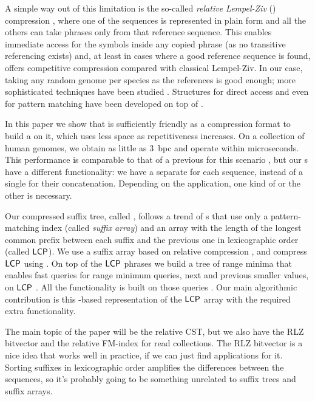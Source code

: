 A simple way out of this limitation is the so-called \emph{relative Lempel-Ziv}
(\RLZ) compression \cite{Kuruppu2010}, where one of the sequences is represented
in plain form and all the others can take phrases only from that reference
sequence. This enables immediate access for the symbols inside any copied
phrase (as no transitive referencing exists) and, at least in cases where a
good reference sequence is found, offers competitive compression compared with
classical Lempel-Ziv. In our case, taking any random genome per species as the
references is good enough; more sophisticated techniques have been studied
\cite{KPZ11}. Structures for direct access \cite{DG11,Ferrada2014}
and even for pattern matching \cite{DJSS14,Belazzougui2014} have been developed
on top of \RLZ.

In this paper we show that \RLZ{} is sufficiently friendly as a compression format
to build a \CST{} on it, which uses less space as repetitiveness increases.
On a collection of human genomes, we obtain as little as 3~bpc and operate
within microseconds. This performance is comparable to that of a previous \CST{}
for this scenario \cite{Navarro2014}, but our \CST{}s have a different
functionality: we have a separate \CST{} for each sequence, instead of a single
\CST{} for their concatenation. Depending on the application, one kind of \CST{} or
the other is necessary.

Our compressed suffix tree, called \RCST, follows a trend of \CST{}s
\cite{Fischer2009a,Ohlebusch2009,Ohlebusch2010,Gog2011a,Abeliuk2013} that use only a pattern-matching index
(called \emph{suffix array}) and an array with the length of the longest common prefix
between each suffix and the previous one in lexicographic order (called $\mathsf{LCP}$).
We use a suffix array based on relative compression \cite{Belazzougui2014}, and
compress $\mathsf{LCP}$ using \RLZ. On top of the $\mathsf{LCP}$ phrases we build a tree
of range minima that enables fast queries for range minimum queries, next and
previous smaller values, on $\mathsf{LCP}$ \cite{Abeliuk2013}. All the \CST{} functionality
is built on those queries \cite{Fischer2009a}. Our main algorithmic contribution
is this \RLZ\nobreakdash-based representation of the $\mathsf{LCP}$ array with the required extra
functionality.

\iffalse
The main topic of the paper will be the relative CST, but we also have the RLZ
bitvector and the relative FM-index for read collections. The RLZ bitvector is
a nice idea that works well in practice, if we can just find applications for
it. Sorting suffixes in lexicographic order amplifies the differences between
the sequences, so it's probably going to be something unrelated to suffix
trees and suffix arrays.

